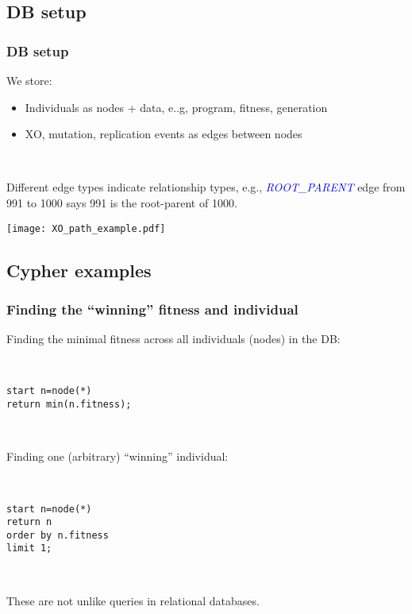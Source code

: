 \documentclass{beamer}
\begin{document}
\subsection{DB setup}

\begin{frame}
\frametitle{DB setup}

We store:
\begin{itemize}
	\item Individuals as nodes + data, e..g, program, fitness, generation
	\item XO, mutation, replication events as edges between nodes
\end{itemize}

~

Different edge types indicate relationship types, e.g., \textcolor{blue}{\emph{ROOT\_PARENT}} edge from 991 to 1000 says 991 is the root-parent of 1000.

\begin{center}
\texttt{[image: XO\_path\_example.pdf]}
\end{center}

\end{frame}

\subsection{Cypher examples}

\begin{frame}
\frametitle{Finding the ``winning'' fitness and individual}

Finding the minimal fitness across all individuals (nodes) in the DB:

~ 

\texttt{start n=node(*) \\
return min(n.fitness);
}

~

Finding one (arbitrary) ``winning'' individual:

~

\texttt{start n=node(*) \\
return n \\
order by n.fitness \\
limit 1;
}

~

These are not unlike queries in relational databases.

\end{frame}
\end{document}
